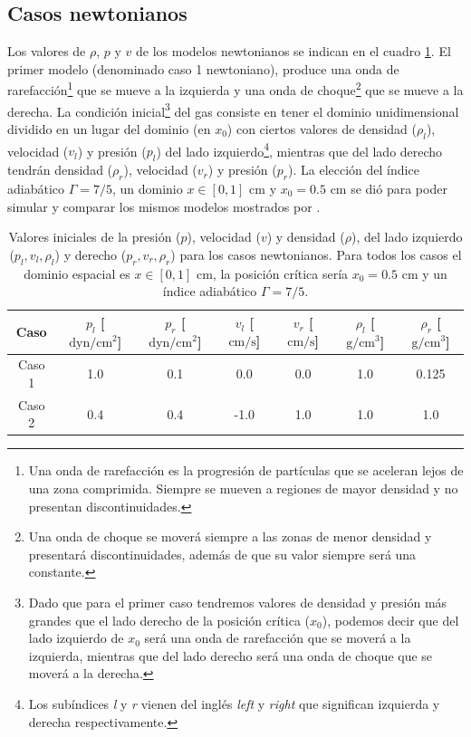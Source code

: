 \documentclass[12pt,a4paper]{book}
\begin{document}
\subsection{Casos newtonianos} \label{subsec:casos_newtonianos_1D}

Los valores de $\rho$, $p$ y $v$ de los modelos newtonianos se indican en el cuadro
\ref{Cuadro_parametros_sod_tube}. El primer  modelo (denominado caso 1 newtoniano), produce una onda 
de rarefacción\footnote{
  Una onda de rarefacción es la progresión de partículas que se aceleran lejos de una zona 
  comprimida. Siempre se mueven a regiones de mayor densidad y no presentan discontinuidades.
} que se mueve a la izquierda y una onda de choque\footnote{
  Una onda de choque se moverá siempre a las zonas de menor densidad y presentará discontinuidades, además
  de que su valor siempre será una constante.
} que se mueve a la derecha. La condición inicial\footnote{
  Dado que para el primer caso tendremos valores de densidad
  y presión más grandes que el lado derecho de la posición crítica ($x_0$), 
  podemos decir que del lado izquierdo 
  de $x_0$ será una onda de rarefacción que se moverá a la izquierda, mientras que del lado
  derecho será una onda de choque que se moverá a la derecha.
} del gas consiste en tener el dominio 
unidimensional dividido en un lugar del dominio (en $x_0$) con ciertos valores de densidad ($\rho_l$), 
velocidad ($v_l$) y presión ($p_l$) del lado izquierdo\footnote{Los subíndices \emph{l} y \emph{r} 
vienen del inglés \emph{left} y \emph{right} que significan izquierda y derecha respectivamente.}, 
mientras que del lado derecho tendrán densidad ($\rho_r$), velocidad ($v_r$) y  presión ($p_r$). 
La elección del índice adiabático $\Gamma = 7/5$, un dominio $x \in [0,1]$ cm y $x_0 = 0.5$ cm 
se dió para poder simular y comparar los mismos modelos
mostrados por \citet{Lora2013}.

\begin{table}[htbp]
  \begin{center}
  \begin{tabular}{|c|c|c|c|c|c|c|}
  \hline 
  \textbf{Caso} & \textbf{$p_l$} [$\text{dyn}/\text{cm}^2$] & \textbf{$p_r$} [$\text{dyn}/\text{cm}^2$]& \textbf{$v_l$} [$\text{cm}/\text{s}$]& \textbf{$v_r$} [$\text{cm}/\text{s}$]& \textbf{$\rho_l$} [$\text{g}/\text{cm}^3$]& \textbf{$\rho_r$} [$\text{g}/\text{cm}^3$] \\ 
  \hline 
  Caso 1 & 1.0  & 0.1  & 0.0 & 0.0 & 1.0  & 0.125 \\ 
  \hline 
  Caso 2 & 0.4  & 0.4  & -1.0 & 1.0 & 1.0  & 1.0  \\ 
  \hline 
  \end{tabular}
  \caption{\label{Cuadro_parametros_sod_tube} Valores iniciales de la presión ($p$), velocidad ($v$)
  y densidad ($\rho$), del lado izquierdo ($p_l, v_l, \rho_l$) y derecho ($p_r, v_r, \rho_r$)
  para los casos newtonianos. Para todos los
  casos el dominio espacial es $x \in [0,1]$ cm, la posición crítica sería
  $x_0 = 0.5$ cm y un índice adiabático $\Gamma = 7/5$.}
  \end{center}
\end{table}
\end{document}

